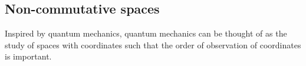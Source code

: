     
%    

\subsection{Non-commutative spaces}
Inspired by quantum mechanics, quantum mechanics can be thought
of as the study of spaces with coordinates such that the order of observation
of coordinates is important. 

